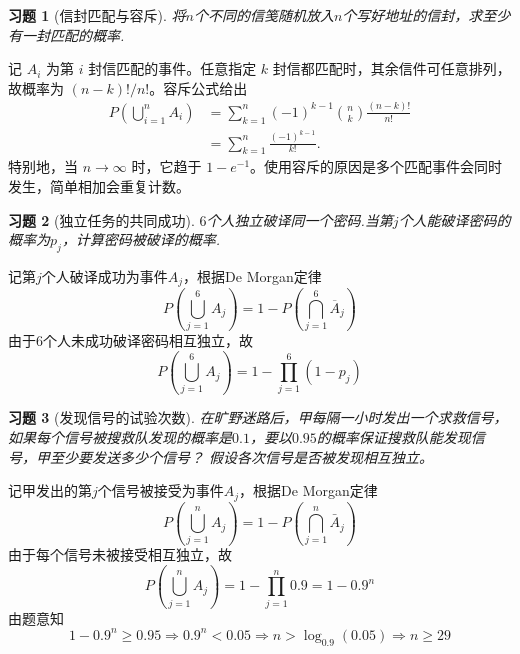 \documentclass[UTF8,12pt,a4paper,fontset=fandol]{ctexart}
\newtheorem{exercise}{习题}[section]
\begin{document}
\begin{exercise}[信封匹配与容斥]\label{q:Y2.5}
将$n$个不同的信笺随机放入$n$个写好地址的信封，求至少有一封匹配的概率.\par{}
\end{exercise}

\begin{solve}\label{a:Y2.5}记 $A_i$ 为第 $i$ 封信匹配的事件。任意指定 $k$ 封信都匹配时，其余信件可任意排列，故概率为 $(n-k)!/n!$。容斥公式给出\[\begin{aligned}P\left(\bigcup_{i=1}^nA_i\right)&=\sum_{k=1}^n(-1)^{k-1}\binom nk\frac{(n-k)!}{n!}\\&=\sum_{k=1}^n\frac{(-1)^{k-1}}{k!}.\end{aligned}\]特别地，当 $n\to\infty$ 时，它趋于 $1-e^{-1}$。使用容斥的原因是多个匹配事件会同时发生，简单相加会重复计数。\end{solve}

\begin{exercise}[独立任务的共同成功]\label{q:Y2.6}
$6$个人独立破译同一个密码.当第$j$个人能破译密码的概率为$p_j$，计算密码被破译的概率.\par{}
\end{exercise}

\begin{solve}\label{a:Y2.6}
记第$j$个人破译成功为事件$A_j$，根据De Morgan定律
\[P(\bigcup\limits_{j = 1}^6 {{A_j}} ) = 1 - P(\bigcap\limits_{j = 1}^6 {{{\overline A }_j}} )\]
由于$6$个人未成功破译密码相互独立，故
\[P(\bigcup\limits_{j = 1}^6 {{A_j}} ) = 1 - \prod\limits_{j = 1}^6 {(1 - {p_j})} \]
\end{solve}

\begin{exercise}[发现信号的试验次数]\label{q:Y2.7}
在旷野迷路后，甲每隔一小时发出一个求救信号，如果每个信号被搜救队发现的概率是$0.1$，要以$0.95$的概率保证搜救队能发现信号，甲至少要发送多少个信号？ 假设各次信号是否被发现相互独立。\par{}
\end{exercise}

\begin{solve}\label{a:Y2.7}
记甲发出的第$j$个信号被接受为事件$A_j$，根据De Morgan定律
\[P(\bigcup\limits_{j = 1}^n {{A_j}} ) = 1 - P(\bigcap\limits_{j = 1}^n {{{\bar A}_j}} )\]
由于每个信号未被接受相互独立，故
\[P(\bigcup\limits_{j = 1}^n {{A_j}} ) = 1 - \prod\limits_{j = 1}^n {0.9}  = 1 - {0.9^n}\]
由题意知
\[1 - {0.9^n} \geqslant 0.95 \Rightarrow {0.9^n} < 0.05 \Rightarrow n > {\log _{0.9}}(0.05) \Rightarrow n \geqslant 29\]
\end{solve}
\end{document}
